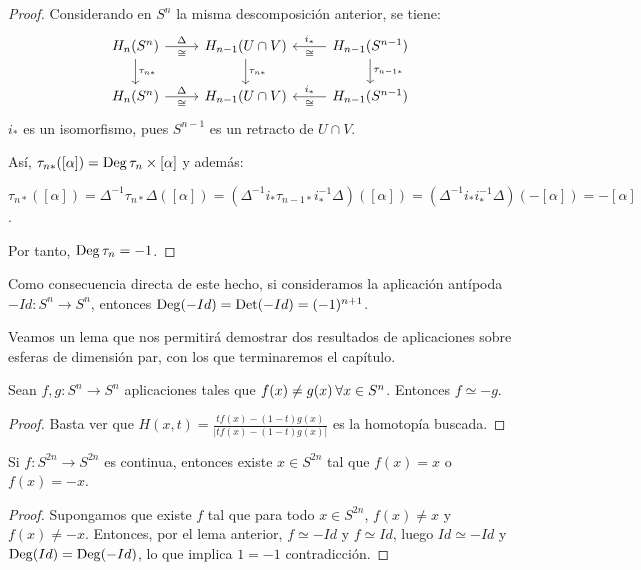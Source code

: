 \begin{proof}
  Considerando en $S^n$ la misma descomposición anterior, se tiene:
  \[ \begin{tikzcd}
    H_n(S^n) \arrow{r}{\Delta}[swap]{\cong} \arrow{d}{\tau_{n*}} & H_{n-1}(U \cap V) \arrow{d}{\tau_{n*}} & \arrow{l}{\cong}[swap]{i_*} H_{n-1}(S^{n-1}) \arrow{d}{\tau_{n-1*}} \\
    H_n(S^n) \arrow{r}{\Delta}[swap]{\cong} & H_{n-1}(U \cap V) & \arrow{l}{\cong}[swap]{i_*} H_{n-1}(S^{n-1})
  \end{tikzcd} \]
  $i_*$ es un isomorfismo, pues $S^{n-1}$ es un retracto de $U \cap V$.

  Así, $\tau_{n*}([\alpha]) = \operatorname{Deg} \tau_n \times [\alpha]$ y además:

  $\tau_{n*}([\alpha]) = \Delta^{-1} \tau_{n*} \Delta([\alpha]) = (\Delta^{-1} i_* \tau_{n-1*} i_*^{-1} \Delta)([\alpha])
  = (\Delta^{-1} i_* i_*^{-1} \Delta)(-[\alpha]) = -[\alpha]$.

  Por tanto, $\operatorname{Deg} \tau_n = -1$.
\end{proof}

Como consecuencia directa de este hecho, si consideramos la aplicación antípoda $-Id \colon S^n \to S^n$, entonces
$\operatorname{Deg} (-Id) = \operatorname{Det} (-Id) = (-1)^{n+1}$.

Veamos un lema que nos permitirá demostrar dos resultados de aplicaciones sobre esferas de dimensión par,
con los que terminaremos el capítulo.

\begin{lemma}
  Sean $f, g \colon S^n \to S^n$ aplicaciones tales que $f(x) \neq g(x) \hspace{0.2em} \forall x \in S^n$.
  Entonces $f \simeq -g$.
\end{lemma}

\begin{proof}
  Basta ver que $H(x, t) = \frac{t f(x) - (1-t)g(x)}{|t f(x) - (1-t)g(x)|}$ es la homotopía buscada.
\end{proof}

\begin{corollary}
  Si $f \colon S^{2n} \to S^{2n}$ es continua, entonces existe $x \in S^{2n}$ tal que $f(x) = x$ o $f(x) = -x$.
\end{corollary}

\begin{proof}
  Supongamos que existe $f$ tal que para todo $x \in S^{2n}$, $f(x) \neq x$ y $f(x) \neq -x$. Entonces, por
  el lema anterior, $f \simeq -Id$ y $f \simeq Id$, luego $Id \simeq -Id$ y $\operatorname{Deg} (Id) = \operatorname{Deg} (-Id)$, lo que implica
  $1 = -1$ contradicción.
\end{proof}

